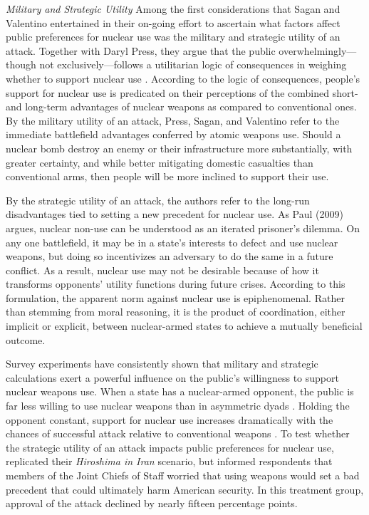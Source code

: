 \documentclass[12pt]{article}
\begin{document}
\textit{Military and Strategic Utility} Among the first considerations that Sagan and Valentino entertained in their on-going effort to ascertain what factors affect public preferences for nuclear use was the military and strategic utility of an attack. Together with Daryl Press, they argue that the public overwhelmingly—though not exclusively—follows a utilitarian logic of consequences in weighing whether to support nuclear use \citep{press_atomic_2013}. According to the logic of consequences, people's support for nuclear use is predicated on their perceptions of the combined short- and long-term advantages of nuclear weapons as compared to conventional ones. By the military utility of an attack, Press, Sagan, and Valentino refer to the immediate battlefield advantages conferred by atomic weapons use. Should a nuclear bomb destroy an enemy or their infrastructure more substantially, with greater certainty, and while better mitigating domestic casualties than conventional arms, then people will be more inclined to support their use.

By the strategic utility of an attack, the authors refer to the long-run disadvantages tied to setting a new precedent for nuclear use. As Paul (2009) argues, nuclear non-use can be understood as an iterated prisoner's dilemma. On any one battlefield, it may be in a state's interests to defect and use nuclear weapons, but doing so incentivizes an adversary to do the same in a future conflict. As a result, nuclear use may not be desirable because of how it transforms opponents' utility functions during future crises. According to this formulation, the apparent norm against nuclear use is epiphenomenal. Rather than stemming from moral reasoning, it is the product of coordination, either implicit or explicit, between nuclear-armed states to achieve a mutually beneficial outcome.

Survey experiments have consistently shown that military and strategic calculations exert a powerful influence on the public's willingness to support nuclear weapons use. When a state has a nuclear-armed opponent, the public is far less willing to use nuclear weapons than in asymmetric dyads \citep{haworth_what_2019,allison_under_2022, smetana_moscow_2022}. Holding the opponent constant, support for nuclear use increases dramatically with the chances of successful attack relative to conventional weapons \citep{press_atomic_2013}. To test whether the strategic utility of an attack impacts public preferences for nuclear use, \citet{sagan_atomic_2024} replicated their\textit{ Hiroshima in Iran} scenario, but informed respondents that members of the Joint Chiefs of Staff worried that using weapons would set a bad precedent that could ultimately harm American security. In this treatment group, approval of the attack declined by nearly fifteen percentage points.
\end{document}
